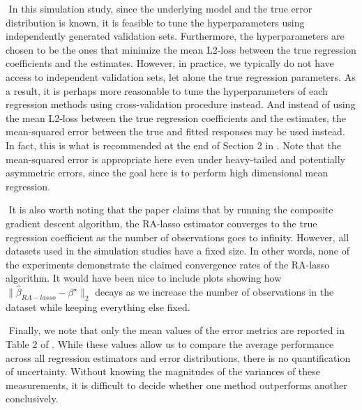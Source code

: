 $ $\newline
In this simulation study, since the underlying model and the true error distribution is known, it is feasible to tune the hyperparameters using independently generated validation sets. Furthermore, the hyperparameters are chosen to be the ones that minimize the mean L2-loss between the true regression coefficients and the estimates. However, in practice, we typically do not have access to independent validation sets, let alone the true regression parameters. As a result, it is perhaps more reasonable to tune the hyperparameters of each regression methods using cross-validation procedure instead. And instead of using the mean L2-loss between the true regression coefficients and the estimates, the mean-squared error between the true and fitted responses may be used instead. In fact, this is what is recommended at the end of Section 2 in \citet{fan2017estimation}. Note that the mean-squared error is appropriate here even under heavy-tailed and potentially asymmetric errors, since the goal here is to perform high dimensional mean regression.

$ $\newline
It is also worth noting that the paper claims that by running the composite gradient descent algorithm, the RA-lasso estimator converges to the true regression coefficient as the number of observations goes to infinity. However, all datasets used in the simulation studies have a fixed size. In other words, none of the experiments demonstrate the claimed convergence rates of the RA-lasso algorithm. It would have been nice to include plots showing how $\| \hat{\beta}_{RA-lasso} - \beta^\star \|_2$ decays as we increase the number of observations in the dataset while keeping everything else fixed.

$ $\newline
Finally, we note that only the mean values of the error metrics are reported in Table 2 of \citet{fan2017estimation}. While these values allow us to compare the average performance across all regression estimators and error distributions, there is no quantification of uncertainty. Without knowing the magnitudes of the variances of these measurements, it is difficult to decide whether one method outperforms another conclusively.